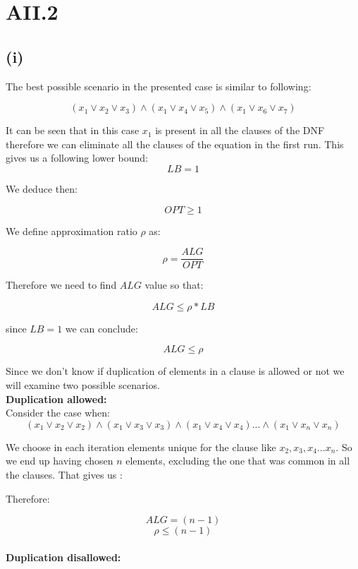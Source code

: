 \section* {AII.2}
\label {a2-2}
\subsection*{(i)}

The best possible scenario in the presented case is similar to following:

$$ (x_1 \vee x_2  \vee x_3) \wedge (x_1 \vee x_4 \vee x_5) \wedge (x_1 \vee x_6 \vee x_7) $$

It can be seen that in this case $ x_1 $ is present in all the clauses of the DNF therefore we can eliminate all the clauses of the equation in the first run. This gives us a following lower bound:
$$ LB = 1 $$ 

We deduce then:

$$ OPT \ge 1 $$

We define approximation ratio $ \rho $ as:

$$ \rho = \frac{ALG}{OPT} $$

Therefore we need to find $ ALG $ value so that:

$$ ALG \le \rho * LB $$ 

since $ LB = 1 $ we can conclude:

$$ ALG \le \rho $$ 

Since we don't know if duplication of elements in a clause is allowed or not we will examine two possible scenarios.\\

\textbf{Duplication allowed:}\\

Consider the case when:\\

$$ (x_1 \vee x_2  \vee x_2) \wedge (x_1 \vee x_3 \vee x_3) \wedge (x_1 \vee x_4 \vee x_4) ... \wedge (x_1 \vee x_n \vee x_n) $$

We choose in each iteration elements unique for the clause like $ x_2 , x_3 , x_4 ... x_n $. So we end up having chosen $ n $ elements, excluding the one that was common in all the clauses. That gives us :

Therefore:

$$ ALG = (n-1) $$ 
$$ \rho \le (n-1) $$ \\

\textbf{Duplication disallowed:}\\

